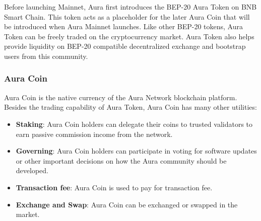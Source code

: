 \documentclass[11pt, titlepage]{article}
\begin{document}
Before launching Mainnet, Aura first introduces the BEP-20 Aura Token on BNB Smart Chain. This token acts as a placeholder for the later Aura Coin that will be introduced when Aura Mainnet launches. Like other BEP-20 tokens, Aura Token can be freely traded on the cryptocurrency market. Aura Token also helps provide liquidity on BEP-20 compatible decentralized exchange and bootstrap users from this community.

\subsubsection{Aura Coin}
Aura Coin is the native currency of the Aura Network blockchain platform. Besides the trading capability of Aura Token, Aura Coin has many other utilities:

\begin{itemize}
    \item \textbf{Staking}: Aura Coin holders can delegate their coins to trusted validators to earn passive commission income from the network.
    \item \textbf{Governing}: Aura Coin holders can participate in voting for software updates or other important decisions on how the Aura community should be developed.
    \item \textbf{Transaction fee}: Aura Coin is used to pay for transaction fee.
    \item \textbf{Exchange and Swap}: Aura Coin can be exchanged or swapped in the market.
\end{itemize}
\end{document}

